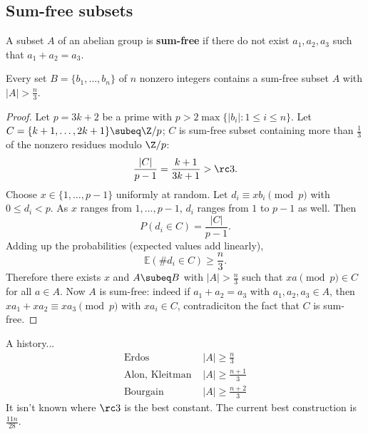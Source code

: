 \subsection{Sum-free subsets}
\begin{df}
A subset $A$ of an abelian group is \textbf{sum-free} if there do not exist $a_1,a_2,a_3$ such that $a_1+a_2=a_3$.
\end{df}
\begin{thm}
Every set $B=\{b_1,\ldots, b_n\}$ of $n$ nonzero integers contains a sum-free subset $A$ with $|A|> \frac n3$.
\end{thm}
\begin{proof}
Let $p=3k+2$ be a prime with $p>2\max\{|b_i|:1\leq i\leq n\}$.  
Let $C=\{k+1,\ldots, 2k+1\}\subeq \Z/p$; $C$ is sum-free subset containing more than $\frac 13$ of the nonzero residues modulo $\Z/p$:
\[\frac{|C|}{p-1}=\frac{k+1}{3k+1}>\rc 3.\]
Choose $x\in \{1,\ldots, p-1\}$ uniformly at random. Let $d_i\equiv xb_i\pmod{p}$ with $0\leq d_i<p$. As $x$ ranges from $1,\ldots, p-1$, $d_i$ ranges from $1$ to $p-1$ as well. Then
\[
P(d_i\in C)=\frac{|C|}{p-1}.
\]
Adding up the probabilities (expected values add linearly),
\[
\mathbb E(\#d_i\in C)\geq \frac n3.
\]
Therefore there exists $x$ and $A\subeq B$ with $|A|>\frac n3$ such that $xa\pmod p\in C$ for all $a\in A$. Now $A$ is sum-free: indeed if $a_1+a_2=a_3$ with $a_1,a_2,a_3\in A$, then $xa_1+xa_2\equiv xa_3\pmod{p}$ with $xa_i\in C$, contradiciton the fact that $C$ is sum-free.
\end{proof}
A history...
\begin{align*}
\text{Er\"dos } &|A|\geq \frac n3\\
\text{Alon, Kleitman } & |A|\geq \frac{n+1}{3}\\
\text{Bourgain } & |A|\geq \frac{n+2}{3}
\end{align*}
It isn't known where $\rc 3$ is the best constant.
The current best construction is $\frac{11n}{28}$.